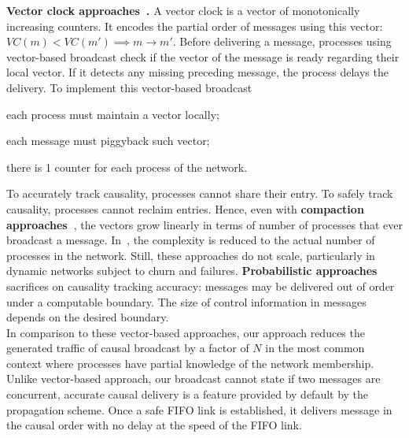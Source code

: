\noindent \textbf{Vector clock
  approaches~\cite{fidge1988timestamps,mattern1989virtual}.}  A vector clock is
a vector of monotonically increasing counters.  It encodes the partial order of
messages using this vector: $VC(m) < VC(m') \implies m \rightarrow m'$.  Before
delivering a message, processes using vector-based broadcast check if the vector
of the message is ready regarding their local vector. If it detects any missing
preceding message, the process delays the delivery.  To implement this
vector-based broadcast
\begin{inparaenum}[(i)]
\item each process must maintain a vector locally;
\item each message must piggyback such vector;
\item there is 1 counter for each process of the network.
\end{inparaenum}
To accurately track causality, processes cannot share their entry. To safely
track causality, processes cannot reclaim entries. Hence, even with
\textbf{compaction approaches~\cite{singhal1992efficient}}, the vectors grow
linearly in terms of number of processes that ever broadcast a message.
In~\cite{almeida2008interval}, the complexity is reduced to the actual number of
processes in the network.  Still, these approaches do not scale, particularly in
dynamic networks subject to churn and failures. \textbf{Probabilistic
  approaches~\cite{mostefaoui2017probabilistic}} sacrifices on causality
tracking accuracy: messages may be delivered out of order under a computable
boundary. The size of control information in messages
depends on the desired boundary. \\
In comparison to these vector-based approaches, our approach reduces the
generated traffic of causal broadcast by a factor of $N$ in the most common
context where processes have partial knowledge of the network membership.
Unlike vector-based approach, our broadcast cannot state if two messages are
concurrent, accurate causal delivery is a feature provided by default by the
propagation scheme. Once a safe FIFO link is established, it delivers message in
the causal order with no delay at the speed of the FIFO link.


